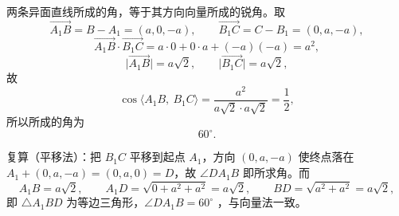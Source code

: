 \begin{answer}

两条异面直线所成的角，等于其方向向量所成的锐角。取
\nopagebreak[4]
\[
\overrightarrow{A_1B}=B-A_1=(a,0,-a),\qquad \overrightarrow{B_1C}=C-B_1=(0,a,-a),
\]
\nopagebreak[4]
\[
\overrightarrow{A_1B}\cdot\overrightarrow{B_1C}=a\cdot0+0\cdot a+(-a)(-a)=a^2,
\]
\nopagebreak[4]
\[
\lvert\overrightarrow{A_1B}\rvert=a\sqrt2,\qquad \lvert\overrightarrow{B_1C}\rvert=a\sqrt2,
\]
故
\nopagebreak[4]
\[
\cos\langle A_1B,\ B_1C\rangle=\frac{a^2}{a\sqrt2\cdot a\sqrt2}=\frac12,
\]
所以所成的角为
\nopagebreak[4]
\[
60^\circ.
\]

复算（平移法）：把 $B_1C$ 平移到起点 $A_1$，方向 $(0,a,-a)$ 使终点落在 $A_1+(0,a,-a)=(0,a,0)=D$，故 $\angle DA_1B$ 即所求角。而
\nopagebreak[4]
\[
A_1B=a\sqrt2,\qquad A_1D=\sqrt{0+a^2+a^2}=a\sqrt2,\qquad BD=\sqrt{a^2+a^2}=a\sqrt2,
\]
即 $\triangle A_1BD$ 为等边三角形，$\angle DA_1B=60^\circ$ ，与向量法一致。



\end{answer}
